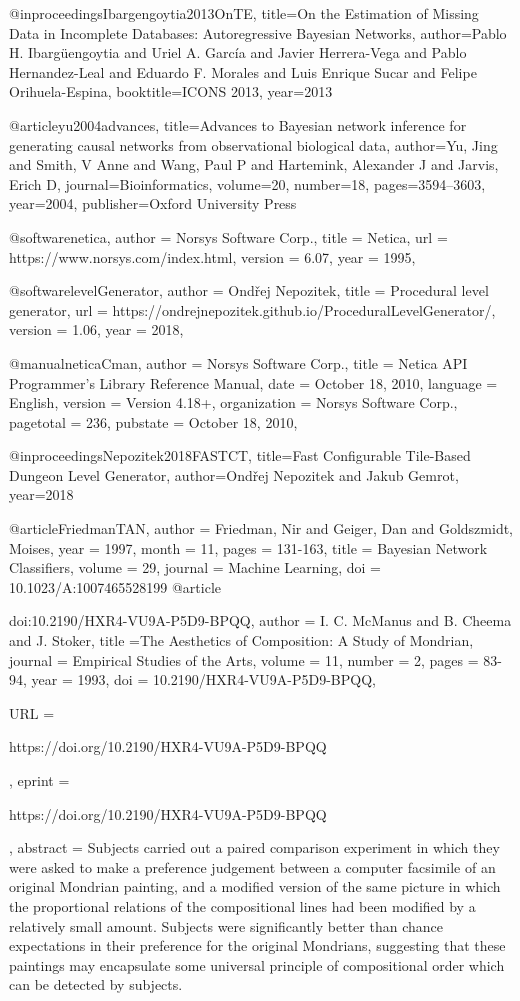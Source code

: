 @inproceedings{Ibargengoytia2013OnTE,
  title={On the Estimation of Missing Data in Incomplete Databases: Autoregressive Bayesian Networks},
  author={Pablo H. Ibarg{\"u}engoytia and Uriel A. Garc{\'i}a and Javier Herrera-Vega and Pablo Hernandez-Leal and Eduardo F. Morales and Luis Enrique Sucar and Felipe Orihuela-Espina},
  booktitle={ICONS 2013},
  year={2013}
}

@article{yu2004advances,
  title={Advances to Bayesian network inference for generating causal networks from observational biological data},
  author={Yu, Jing and Smith, V Anne and Wang, Paul P and Hartemink, Alexander J and Jarvis, Erich D},
  journal={Bioinformatics},
  volume={20},
  number={18},
  pages={3594--3603},
  year={2004},
  publisher={Oxford University Press}
}

@software{netica,
  author = {{Norsys Software Corp.}},
  title = {Netica},
  url = {https://www.norsys.com/index.html},
  version = {6.07},
  year = {1995},
}

@software{levelGenerator,
  author = {Ondřej Nepozitek},
  title = {Procedural level generator},
  url = {https://ondrejnepozitek.github.io/ProceduralLevelGenerator/},
  version = {1.06},
  year = {2018},
}

@manual{neticaCman,
author = {Norsys Software Corp.},
title = {Netica API Programmer's Library Reference Manual},
date = {October 18, 2010},
language = {English},
version = {Version 4.18+},
organization = {Norsys Software Corp.},
pagetotal = {236},
pubstate = {October 18, 2010},
}

@inproceedings{Nepozitek2018FASTCT,
  title={Fast Configurable Tile-Based Dungeon Level Generator},
  author={Ondřej Nepozitek and Jakub Gemrot},
  year={2018}
}

@article{FriedmanTAN,
author = {Friedman, Nir and Geiger, Dan and Goldszmidt, Moises},
year = {1997},
month = {11},
pages = {131-163},
title = {Bayesian Network Classifiers},
volume = {29},
journal = {Machine Learning},
doi = {10.1023/A:1007465528199}
}
@article{doi:10.2190/HXR4-VU9A-P5D9-BPQQ,
author = {I. C. McManus and B. Cheema and J. Stoker},
title ={The Aesthetics of Composition: A Study of Mondrian},
journal = {Empirical Studies of the Arts},
volume = {11},
number = {2},
pages = {83-94},
year = {1993},
doi = {10.2190/HXR4-VU9A-P5D9-BPQQ},

URL = { 
        https://doi.org/10.2190/HXR4-VU9A-P5D9-BPQQ
    
},
eprint = { 
        https://doi.org/10.2190/HXR4-VU9A-P5D9-BPQQ
    
}
,
    abstract = { Subjects carried out a paired comparison experiment in which they were asked to make a preference judgement between a computer facsimile of an original Mondrian painting, and a modified version of the same picture in which the proportional relations of the compositional lines had been modified by a relatively small amount. Subjects were significantly better than chance expectations in their preference for the original Mondrians, suggesting that these paintings may encapsulate some universal principle of compositional order which can be detected by subjects. }
}

